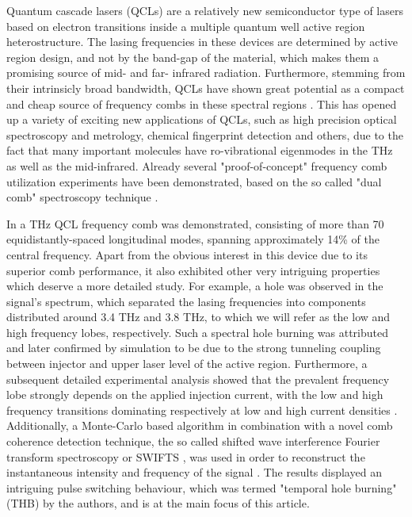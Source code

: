 \documentclass[]{spie}  %
\begin{document}
Quantum cascade lasers (QCLs) are a relatively new semiconductor type of lasers based on electron transitions inside a multiple quantum well active region heterostructure. The lasing
frequencies in these devices are determined by active region design, and not by the band-gap of the material, which makes them a promising source of mid- and far- infrared radiation. Furthermore, stemming from their intrinsicly broad bandwidth, QCLs have shown great potential as a compact and cheap source of frequency combs in these spectral regions \cite{burghoff2014terahertz,hugi2012mid,rosch2015octave}. This has opened up a variety of exciting new applications of QCLs, such as high precision optical spectroscopy and metrology, chemical fingerprint detection and others, due to the fact that many important molecules have ro-vibrational eigenmodes in the THz as well as the mid-infrared. Already several "proof-of-concept" frequency comb utilization experiments have been demonstrated, based on the so called "dual comb" spectroscopy technique \cite{villares2014dual,yang2016terahertz}.

In  a THz QCL frequency comb was demonstrated, consisting of more than 70 equidistantly-spaced longitudinal modes, spanning approximately 14\% of the central frequency. Apart from the obvious interest in this device due to its superior comb performance, it also exhibited other very intriguing properties which deserve a more detailed study. For example, a hole was observed in the signal's spectrum, which separated the lasing frequencies into components distributed around 3.4 THz and 3.8 THz, to which we will refer  as the low and high frequency lobes, respectively. Such a spectral hole burning was attributed and later confirmed by simulation \cite{petz2016} to be due to the strong tunneling coupling between injector and upper laser level of the active region. Furthermore, a subsequent detailed experimental analysis \cite{burghoff2015evaluating} showed that the prevalent frequency lobe strongly depends on the applied injection current, with the low and high frequency transitions dominating respectively at low and high current densities \cite{burghoff2015evaluating}. Additionally, a Monte-Carlo based algorithm in combination with a novel comb coherence detection technique, the so called shifted wave interference Fourier transform spectroscopy or SWIFTS \cite{burghoff2014broadband}, was used in order to reconstruct the instantaneous intensity and frequency of the signal \cite{burghoff2015evaluating}. The results displayed an intriguing pulse switching behaviour, which was termed "temporal hole burning" (THB) by the authors, and is at the main focus of this article. 
\end{document}
